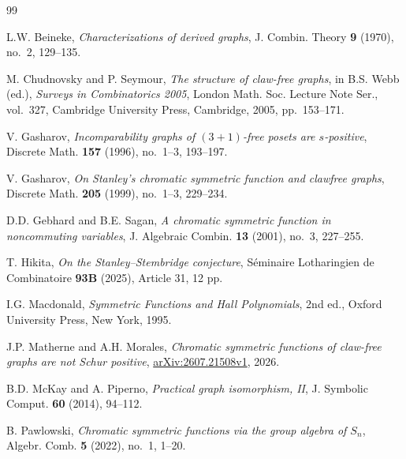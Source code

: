 \documentclass[11pt]{amsart}
\numberwithin{equation}{section}
\theoremstyle{remark}
\begin{document}
\begin{thebibliography}{99}

\label{ref:Beineke1970} L.W. Beineke, \emph{Characterizations of derived graphs}, J. Combin. Theory \textbf{9} (1970), no.~2, 129--135.

\label{ref:ChudnovskySeymour2005}
M. Chudnovsky and P. Seymour,
\emph{The structure of claw-free graphs},
in B.S. Webb (ed.), \emph{Surveys in Combinatorics 2005},
London Math. Soc. Lecture Note Ser., vol.~327,
Cambridge University Press, Cambridge, 2005, pp.~153--171.

\label{ref:Gasharov1996} V. Gasharov, \emph{Incomparability graphs of $(3+1)$-free posets are $s$-positive}, Discrete Math. \textbf{157} (1996), no.~1--3, 193--197.

\label{ref:Gasharov1999} V. Gasharov, \emph{On Stanley's chromatic symmetric function and clawfree graphs}, Discrete Math. \textbf{205} (1999), no.~1--3, 229--234.

\label{ref:GebhardSagan2001} D.D. Gebhard and B.E. Sagan, \emph{A chromatic symmetric function in noncommuting variables}, J. Algebraic Combin. \textbf{13} (2001), no.~3, 227--255.

\label{ref:Hikita2025} T. Hikita, \emph{On the Stanley--Stembridge conjecture}, S\'eminaire Lotharingien de Combinatoire \textbf{93B} (2025), Article 31, 12 pp.

\label{ref:Macdonald1995} I.G. Macdonald, \emph{Symmetric Functions and Hall Polynomials}, 2nd ed., Oxford University Press, New York, 1995.

\label{ref:MM2026} J.P. Matherne and A.H. Morales, \emph{Chromatic symmetric functions of claw-free graphs are not Schur positive}, \href{https://arxiv.org/abs/2607.21508v1}{arXiv:2607.21508v1}, 2026.

\label{ref:McKayPiperno2014} B.D. McKay and A. Piperno, \emph{Practical graph isomorphism, II}, J. Symbolic Comput. \textbf{60} (2014), 94--112.

\label{ref:Pawlowski2022} B. Pawlowski, \emph{Chromatic symmetric functions via the group algebra of $S_n$}, Algebr. Comb. \textbf{5} (2022), no.~1, 1--20.


\end{thebibliography}
\end{document}
